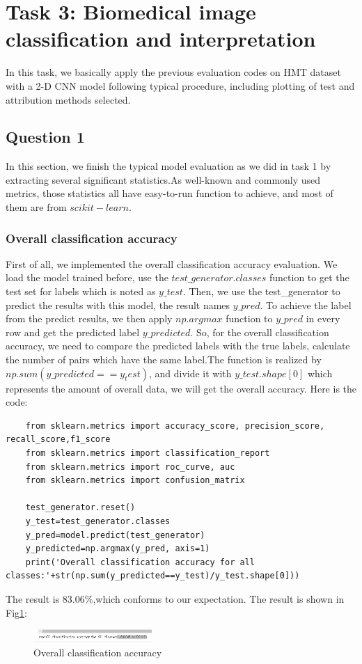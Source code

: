 \documentclass[conference]{IEEEtran}
\begin{document}
\section{Task 3: Biomedical image classification and interpretation}
In this task, we basically apply the previous evaluation codes on HMT dataset with a 2-D CNN model following typical procedure, including plotting of test and attribution methods selected.
\subsection{Question 1}
In this section, we finish the typical model evaluation as we did in task 1 by extracting several significant statistics.As well-known and commonly used metrics, those statistics all have easy-to-run
function to achieve, and most of them are from $scikit-learn$.
\subsubsection{Overall classification accuracy}
First of all, we implemented the overall classification accuracy evaluation. We load the model trained before, use the $test\_generator.classes$ function to get the test set for labels which is noted as $y\_test$.
Then, we use the test_generator to predict the results with this model, the result names $y\_pred$. To achieve the label from the predict results, we then apply $np.argmax$ function to $y\_pred$ in every row and get the predicted label $y\_predicted$. 
So, for the overall classification accuracy, we need to compare the predicted labels with the true labels, calculate the number of pairs which have the same label.The function is realized by $np.sum(y\_predicted==y_test)$, and divide it with $y\_test.shape[0]$ which represents the amount of overall data, we will get the overall accuracy.
Here is the code:
\begin{lstlisting}
    from sklearn.metrics import accuracy_score, precision_score, recall_score,f1_score
    from sklearn.metrics import classification_report
    from sklearn.metrics import roc_curve, auc
    from sklearn.metrics import confusion_matrix

    test_generator.reset()
    y_test=test_generator.classes
    y_pred=model.predict(test_generator)
    y_predicted=np.argmax(y_pred, axis=1)
    print('Overall classification accuracy for all classes:'+str(np.sum(y_predicted==y_test)/y_test.shape[0]))
\end{lstlisting}
The result is 83.06\%,which conforms to our expectation. The result is shown in Fig\ref{Fig.t3q1}:
\begin{figure}[h] 
    \centering
    \includegraphics[width=0.4\textwidth]{T3Q1a.png}
    \caption{Overall classification accuracy}
    \label{Fig.t3q1}
\end{figure}
\end{document}

